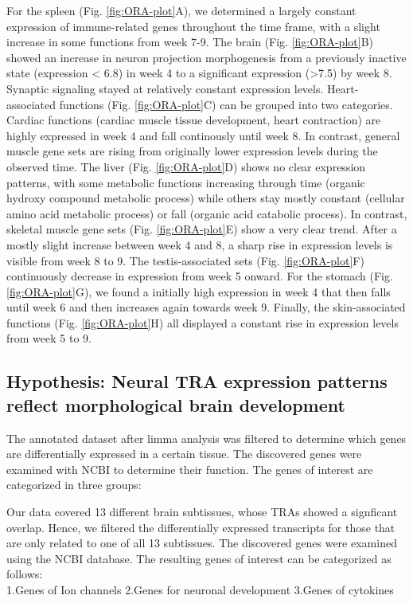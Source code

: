 \documentclass[
]{article}
\begin{document}
For the spleen (Fig. \ref{fig:ORA-plot}A), we determined a largely constant expression of immune-related genes throughout the time frame, with a slight increase in some functions from week 7-9.
The brain (Fig. \ref{fig:ORA-plot}B) showed an increase in neuron projection morphogenesis from a previously inactive state (expression \textless{} 6.8) in week 4 to a significant expression (\textgreater7.5) by week 8. Synaptic signaling stayed at relatively constant expression levels.
Heart-associated functions (Fig. \ref{fig:ORA-plot}C) can be grouped into two categories. Cardiac functions (cardiac muscle tissue development, heart contraction) are highly expressed in week 4 and fall continously until week 8. In contrast, general muscle gene sets are rising from originally lower expression levels during the observed time.
The liver (Fig. \ref{fig:ORA-plot}D) shows no clear expression patterns, with some metabolic functions increasing through time (organic hydroxy compound metabolic process) while others stay mostly constant (cellular amino acid metabolic process) or fall (organic acid catabolic process). In contrast, skeletal muscle gene sets (Fig. \ref{fig:ORA-plot}E) show a very clear trend. After a mostly slight increase between week 4 and 8, a sharp rise in expression levels is visible from week 8 to 9.
The testis-associated sets (Fig. \ref{fig:ORA-plot}F) continuously decrease in expression from week 5 onward.
For the stomach (Fig. \ref{fig:ORA-plot}G), we found a initially high expression in week 4 that then falls until week 6 and then increases again towards week 9.
Finally, the skin-associated functions (Fig. \ref{fig:ORA-plot}H) all displayed a constant rise in expression levels from week 5 to 9.

\hypertarget{brain}{%
\subsection{Hypothesis: Neural TRA expression patterns reflect morphological brain development}\label{brain}}

The annotated dataset after limma analysis was filtered to determine which genes are differentially expressed in a certain tissue. The discovered genes were examined with NCBI to determine their function. The genes of interest are categorized in three groups:

Our data covered 13 different brain subtissues, whose TRAs showed a signficant overlap. Hence, we filtered the differentially expressed transcripts for those that are only related to one of all 13 subtissues. The discovered genes were examined using the NCBI database. The resulting genes of interest can be categorized as follows:\\
1.Genes of Ion channels 2.Genes for neuronal development 3.Genes of cytokines
\end{document}
